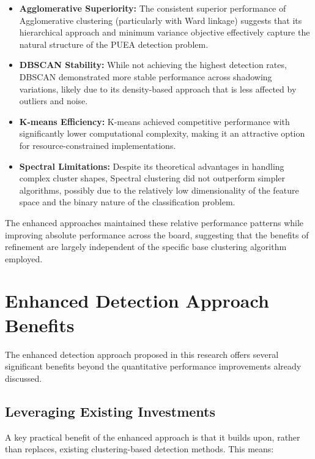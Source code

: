\begin{itemize}
    \item \textbf{Agglomerative Superiority:} The consistent superior performance of Agglomerative clustering (particularly with Ward linkage) suggests that its hierarchical approach and minimum variance objective effectively capture the natural structure of the PUEA detection problem.
    
    \item \textbf{DBSCAN Stability:} While not achieving the highest detection rates, DBSCAN demonstrated more stable performance across shadowing variations, likely due to its density-based approach that is less affected by outliers and noise.
    
    \item \textbf{K-means Efficiency:} K-means achieved competitive performance with significantly lower computational complexity, making it an attractive option for resource-constrained implementations.
    
    \item \textbf{Spectral Limitations:} Despite its theoretical advantages in handling complex cluster shapes, Spectral clustering did not outperform simpler algorithms, possibly due to the relatively low dimensionality of the feature space and the binary nature of the classification problem.
\end{itemize}

The enhanced approaches maintained these relative performance patterns while improving absolute performance across the board, suggesting that the benefits of refinement are largely independent of the specific base clustering algorithm employed.

\section{Enhanced Detection Approach Benefits}

The enhanced detection approach proposed in this research offers several significant benefits beyond the quantitative performance improvements already discussed.

\subsection{Leveraging Existing Investments}

A key practical benefit of the enhanced approach is that it builds upon, rather than replaces, existing clustering-based detection methods. This means:

